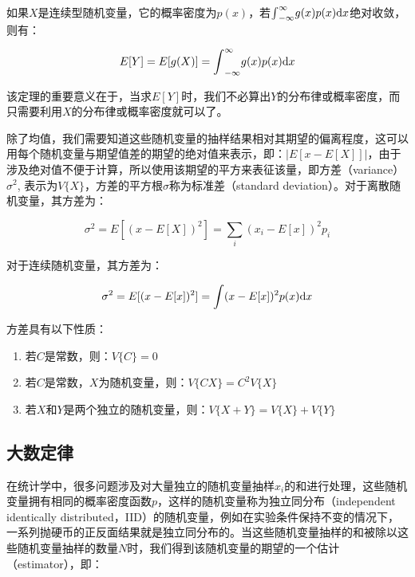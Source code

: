 如果$X$是连续型随机变量，它的概率密度为$p(x)$，若${\rm \int}^{\infty}_{-\infty}g(x)p(x){\rm d}x$绝对收敛，则有：

\begin{equation}
	E[Y]=E[g(X)]={\rm \int}^{\infty}_{-\infty}g(x)p(x){\rm d}x
\end{equation}

该定理的重要意义在于，当求$E[Y]$时，我们不必算出$Y$的分布律或概率密度，而只需要利用$X$的分布律或概率密度就可以了。

除了均值，我们需要知道这些随机变量的抽样结果相对其期望的偏离程度，这可以用每个随机变量与期望值差的期望的绝对值来表示，即：$|E[x-E[X]]|$，由于涉及绝对值不便于计算，所以使用该期望的平方来表征该量，即方差（variance）$\sigma^2$, 表示为$V\{X\}$，方差的平方根$\sigma$称为标准差（standard deviation）。对于离散随机变量，其方差为：

\begin{equation}
	\sigma^2=E[(x-E[X])^2]=\sum_i (x_i-E[x])^2p_i
\end{equation}

\noindent 对于连续随机变量，其方差为：

\begin{equation}\label{e:discrete-variance}
	\sigma^2=E[(x-E[x])^2]={\rm \int} (x-E[x])^2 p(x){\rm d}x
\end{equation}

方差具有以下性质：
\begin{enumerate}
	\item 若$C$是常数，则：$V\{C\}=0$
	\item 若$C$是常数，$X$为随机变量，则：$V\{CX\}=C^2V\{X\}$
	\item 若$X$和$Y$是两个独立的随机变量，则：$V\{X+Y\}=V\{X\}+V\{Y\}$
\end{enumerate}



\subsection{大数定律}
在统计学中，很多问题涉及对大量独立的随机变量抽样$x_i$的和进行处理，这些随机变量拥有相同的概率密度函数$p$，这样的随机变量称为独立同分布（independent identically distributed，IID）的随机变量，例如在实验条件保持不变的情况下，一系列抛硬币的正反面结果就是独立同分布的。当这些随机变量抽样的和被除以这些随机变量抽样的数量$N$时，我们得到该随机变量的期望的一个估计（estimator），即：

